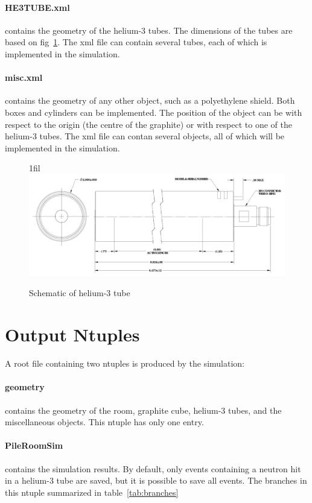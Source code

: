 \documentclass{article}
\makeatletter
\newcommand*{\centerfloat}{%
  \parindent \z@
  \leftskip \z@ \@plus 1fil \@minus \textwidth
  \rightskip\leftskip
  \parfillskip \z@skip}
\makeatother
\begin{document}
	\paragraph{HE3TUBE.xml} contains the geometry of the helium-3 tubes. The dimensions of the tubes are based on fig~\ref{fig:tubeSchematic}. The xml file can contain several tubes, each of which is implemented in the simulation.



	\paragraph{misc.xml} contains the geometry of any other object, such as a polyethylene shield. Both boxes and cylinders can be implemented. The position of the object can be with respect to the origin (the centre of the graphite) or with respect to one of the helium-3 tubes. The xml file can contan several objects, all of which will be implemented in the simulation.


\begin{figure}[htb]
	\centerfloat
	\includegraphics[width=\columnwidth]{images/GESchematic.pdf}
	\caption{Schematic of helium-3 tube}	
	\label{fig:tubeSchematic}
\end{figure}


\section{Output Ntuples}

	A root file containing two ntuples is produced by the simulation:

	\paragraph{geometry} contains the geometry of the room, graphite cube, helium-3 tubes, and the miscellaneous objects. This ntuple has only one entry.

	\paragraph{PileRoomSim} contains the simulation results. By default, only events containing a neutron hit in a helium-3 tube are saved, but it is possible to save all events. The branches in this ntuple summarized in table~\ref{tab:branches}
\end{document}
